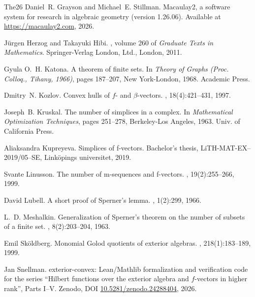 \documentclass[11pt, a4paper, abstract=yes]{scrartcl}
\theoremstyle{definition}
\theoremstyle{remark}
\theoremstyle{plain}
\begin{document}
\begin{thebibliography}{{The}26}
Daniel~R. Grayson and Michael~E. Stillman.
\newblock Macaulay2, a software system for research in algebraic geometry
  (version 1.26.06).
\newblock Available at \url{https://macaulay2.com}, 2026.

J{\"u}rgen Herzog and Takayuki Hibi.
, volume 260 of {\em Graduate Texts in
  Mathematics}.
\newblock Springer-Verlag London, Ltd., London, 2011.

Gyula O.~H. Katona.
\newblock A theorem of finite sets.
\newblock In {\em Theory of Graphs (Proc. Colloq., Tihany, 1966)}, pages
  187--207, New York-London, 1968. Academic Press.

Dmitry~N. Kozlov.
\newblock Convex hulls of $f$- and $\beta$-vectors.
, 18(4):421--431, 1997.

Joseph~B. Kruskal.
\newblock The number of simplices in a complex.
\newblock In {\em Mathematical Optimization Techniques}, pages 251--278,
  Berkeley-Los Angeles, 1963. Univ. of California Press.

Aliaksandra Kupreyeva.
\newblock Simplices of f-vectors.
\newblock Bachelor's thesis, {LiTH-MAT-EX--2019/05--SE}, Link{\"o}pings
  universitet, 2019.

Svante Linusson.
\newblock The number of m-sequences and f-vectors.
, 19(2):255--266, 1999.

David Lubell.
\newblock A short proof of {S}perner's lemma.
, 1(2):299, 1966.

L.~D. Meshalkin.
\newblock Generalization of {S}perner's theorem on the number of subsets of a
  finite set.
, 8(2):203--204,
  1963.

Emil Sk{\"o}ldberg.
\newblock Monomial {G}olod quotients of exterior algebras.
, 218(1):183--189, 1999.

Jan Snellman.
\newblock exterior-convex: {Lean}/{Mathlib} formalization and verification code
  for the series ``{H}ilbert functions over the exterior algebra and
  \(f\)-vectors in higher rank'', {P}arts {I}--{V}.
\newblock Zenodo, DOI
  \href{https://doi.org/10.5281/zenodo.24288404}{10.5281/zenodo.24288404},
  2026.


\end{thebibliography}
\end{document}
